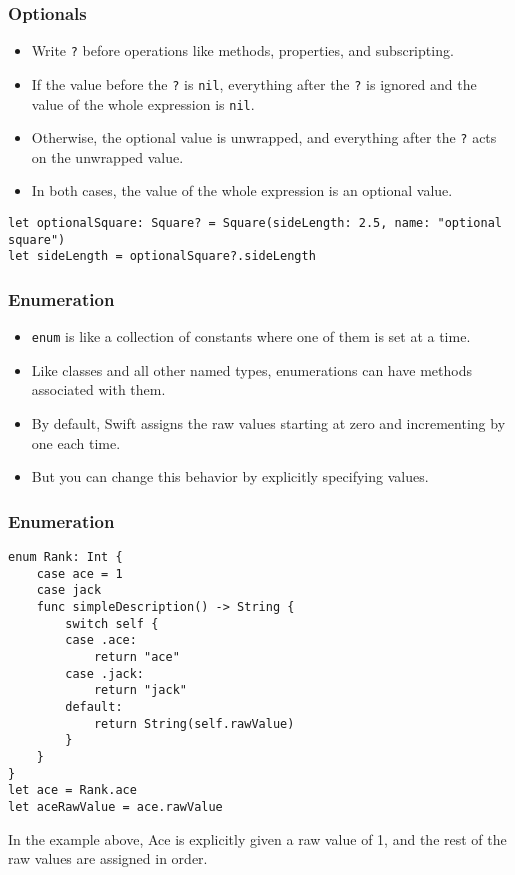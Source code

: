 \begin{frame}[fragile] \frametitle{Optionals}

\begin{itemize}
\item Write \lstinline|?| before operations like methods, properties, and subscripting. 
\item If the value before the \lstinline|?| is \lstinline|nil|, everything after the \lstinline|?| is ignored and the value of the whole expression is \lstinline|nil|. 
\item Otherwise, the optional value is unwrapped, and everything after the \lstinline|?| acts on the unwrapped value. 
\item In both cases, the value of the whole expression is an optional value.
\end{itemize}

\begin{lstlisting}
let optionalSquare: Square? = Square(sideLength: 2.5, name: "optional square")
let sideLength = optionalSquare?.sideLength
\end{lstlisting}


\end{frame}

\begin{frame}[fragile] \frametitle{Enumeration}

\begin{itemize}
\item \lstinline|enum| is like a collection of constants where one of them is set at a time. 
\item Like classes and all other named types, enumerations can have methods associated with them.
\item By default, Swift assigns the raw values starting at zero and incrementing by one each time.
\item But you can change this behavior by explicitly specifying values. 
\end{itemize}

\end{frame}


\begin{frame}[fragile] \frametitle{Enumeration}
\begin{lstlisting}
enum Rank: Int {
    case ace = 1
    case jack
    func simpleDescription() -> String {
        switch self {
        case .ace:
            return "ace"
        case .jack:
            return "jack"
        default:
            return String(self.rawValue)
        }
    }
}
let ace = Rank.ace
let aceRawValue = ace.rawValue
\end{lstlisting}
In the example above, Ace is explicitly given a raw value of 1, and the rest of the raw values are assigned in order.

\end{frame}

